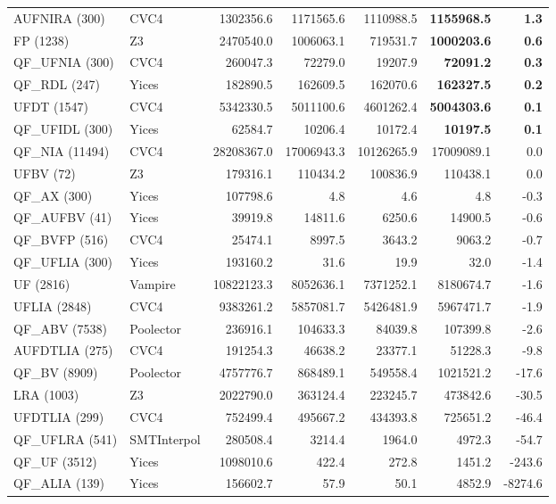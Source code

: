 \begin{tabular}{l@{\hspace{1em}}lrrrrr}
AUFNIRA (300)        & CVC4         & 1302356.6   & 1171565.6   & 1110988.5   & \textbf{1155968.5} & \textbf{1.3}\\
FP (1238)            & Z3           & 2470540.0   & 1006063.1   & 719531.7    & \textbf{1000203.6} & \textbf{0.6}\\
QF\_UFNIA (300)      & CVC4         & 260047.3    & 72279.0     & 19207.9     & \textbf{72091.2} & \textbf{0.3}\\
QF\_RDL (247)        & Yices        & 182890.5    & 162609.5    & 162070.6    & \textbf{162327.5} & \textbf{0.2}\\
UFDT (1547)          & CVC4         & 5342330.5   & 5011100.6   & 4601262.4   & \textbf{5004303.6} & \textbf{0.1}\\
QF\_UFIDL (300)      & Yices        & 62584.7     & 10206.4     & 10172.4     & \textbf{10197.5} & \textbf{0.1}\\
QF\_NIA (11494)      & CVC4         & 28208367.0  & 17006943.3  & 10126265.9  & 17009089.1  & 0.0 \\
UFBV (72)            & Z3           & 179316.1    & 110434.2    & 100836.9    & 110438.1    & 0.0 \\
QF\_AX (300)         & Yices        & 107798.6    & 4.8         & 4.6         & 4.8         & -0.3\\
QF\_AUFBV (41)       & Yices        & 39919.8     & 14811.6     & 6250.6      & 14900.5     & -0.6\\
QF\_BVFP (516)       & CVC4         & 25474.1     & 8997.5      & 3643.2      & 9063.2      & -0.7\\
QF\_UFLIA (300)      & Yices        & 193160.2    & 31.6        & 19.9        & 32.0        & -1.4\\
UF (2816)            & Vampire      & 10822123.3  & 8052636.1   & 7371252.1   & 8180674.7   & -1.6\\
UFLIA (2848)         & CVC4         & 9383261.2   & 5857081.7   & 5426481.9   & 5967471.7   & -1.9\\
QF\_ABV (7538)       & Poolector    & 236916.1    & 104633.3    & 84039.8     & 107399.8    & -2.6\\
AUFDTLIA (275)       & CVC4         & 191254.3    & 46638.2     & 23377.1     & 51228.3     & -9.8\\
QF\_BV (8909)        & Poolector    & 4757776.7   & 868489.1    & 549558.4    & 1021521.2   & -17.6\\
LRA (1003)           & Z3           & 2022790.0   & 363124.4    & 223245.7    & 473842.6    & -30.5\\
UFDTLIA (299)        & CVC4         & 752499.4    & 495667.2    & 434393.8    & 725651.2    & -46.4\\
QF\_UFLRA (541)      & SMTInterpol  & 280508.4    & 3214.4      & 1964.0      & 4972.3      & -54.7\\
QF\_UF (3512)        & Yices        & 1098010.6   & 422.4       & 272.8       & 1451.2      & -243.6\\
QF\_ALIA (139)       & Yices        & 156602.7    & 57.9        & 50.1        & 4852.9      & -8274.6\\
\bottomrule
\end{tabular}